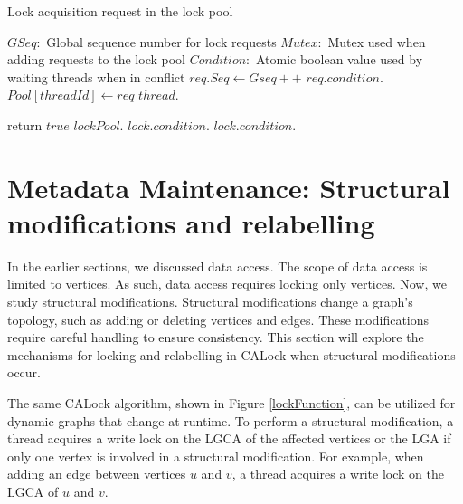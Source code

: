\begin{algorithm}
	\caption{Lock acquisition request in the lock pool}\label{lockFunction}
	\begin{algorithmic}[1]
		\State $GSeq: $ Global sequence number for lock requests
		\State $Mutex: $ Mutex used when adding requests to the lock pool
		\State $Condition:$ Atomic boolean value used by waiting threads when in conflict
		\Statex
		\State {}
		\State $req.Seq \gets Gseq++$ \label{seqNoAllocation}
		\State $req.condition.$ \label{waitTrue}
		\State $Pool[threadId] \gets req$ \label{addToPool}
		\State {}
		 \label{conflictCheck}
		\State $thread.$
		\EndIf
		
		\EndFor
		\State return $true$
		\EndProcedure
		\Statex
		\State $lockPool.$
		\State $lock.condition.$
		\State $lock.condition.$
		\EndProcedure
	\end{algorithmic}
\end{algorithm}






\section{Metadata Maintenance: Structural modifications and relabelling}

In the earlier sections, we discussed data access. The scope of data access is limited to vertices. As such, data access requires locking only vertices. Now, we study structural modifications. Structural modifications change a graph's topology, such as adding or deleting vertices and edges. These modifications require careful handling to ensure consistency. This section will explore the mechanisms for locking and relabelling in CALock when structural modifications occur.

The same CALock algorithm, shown in Figure \ref{lockFunction}, can be utilized for dynamic graphs that change at runtime. 
To perform a structural modification, a thread acquires a write lock on the LGCA of the affected vertices or the LGA if only one vertex is involved in a structural modification. For example, when adding an edge between vertices $u$ and $v$, a thread acquires a write lock on the LGCA of $u$ and $v$. 

